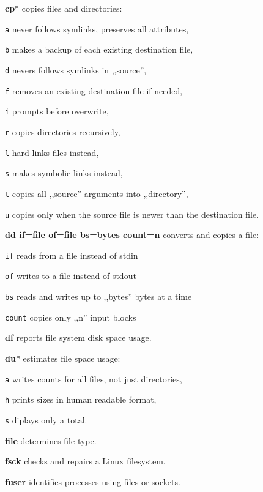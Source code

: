 \textbf{cp}* copies files and directories:
\begin{enumx}
	\item [\texttt{a}] never follows symlinks, preserves all attributes,
	\item [\texttt{b}] makes a backup of each existing destination file,
	\item [\texttt{d}] nevers follows symlinks in ,,source'',
	\item [\texttt{f}] removes an existing destination file if needed,
	\item [\texttt{i}] prompts before overwrite,
	\item [\texttt{r}] copies directories recursively,
	\item [\texttt{l}] hard links files instead,
	\item [\texttt{s}] makes symbolic links instead,
	\item [\texttt{t}] copies all ,,source'' arguments into ,,directory'',
	\item [\texttt{u}] copies only when the source file
	 is newer than the destination file.
\end{enumx}

\textbf{dd if=file of=file bs=bytes count=n} converts and copies a file:
\begin{enumx}
	\item [\texttt{if}] reads from a file instead of stdin
	\item [\texttt{of}] writes to a file instead of stdout
	\item [\texttt{bs}] reads and writes up to ,,bytes'' bytes at a time
	\item [\texttt{count}] copies only ,,n'' input blocks
\end{enumx}

\textbf{df} reports file system disk space usage.

\textbf{du}* estimates file space usage:
\begin{enumx}
	\item [\texttt{a}] writes counts for all files, not just directories,
	\item [\texttt{h}] prints sizes in human readable format,
	\item [\texttt{s}] diplays only a total.
\end{enumx}

\textbf{file} determines file type.

\textbf{fsck} checks and repairs a Linux filesystem.

\textbf{fuser} identifies processes using files or sockets.

